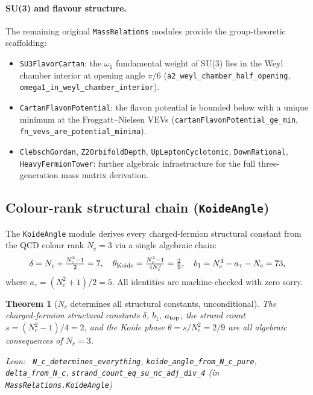 \documentclass[11pt,a4paper]{article}
\newenvironment{leanref}%
  {\par\smallskip\noindent\begingroup\raggedright\textup{Lean:}~}%
  {\par\endgroup}
\newtheorem{theorem}{Theorem}[section]
\theoremstyle{definition}
\begin{document}
\paragraph{SU(3) and flavour structure.}
The remaining original \texttt{MassRelations} modules provide the group-theoretic
scaffolding:
\begin{itemize}[nosep]
\item \texttt{SU3FlavorCartan}: the $\omega_1$ fundamental weight of
  SU(3) lies in the Weyl chamber interior at opening angle $\pi/6$
  (\lstinline|a2_weyl_chamber_half_opening|,
  \lstinline|omega1_in_weyl_chamber_interior|).
\item \texttt{CartanFlavonPotential}: the flavon potential is bounded
  below with a unique minimum at the Froggatt--Nielsen VEVs
  (\lstinline|cartanFlavonPotential_ge_min|,
  \lstinline|fn_vevs_are_potential_minima|).
\item \texttt{ClebschGordan}, \texttt{Z2OrbifoldDepth},
  \texttt{UpLeptonCyclotomic}, \texttt{DownRational},
  \texttt{HeavyFermionTower}: further algebraic infrastructure
  for the full three-generation mass matrix derivation.
\end{itemize}

\subsection{Colour-rank structural chain (\texttt{KoideAngle})}\label{subsec:koideangle}

The \texttt{KoideAngle} module derives every charged-fermion structural
constant from the QCD colour rank $N_c = 3$ via a single algebraic chain:
\[
  \delta = N_c + \tfrac{N_c^2-1}{2} = 7,\quad
  \theta_{\rm Koide} = \tfrac{N_c^2-1}{4N_c^2} = \tfrac{2}{9},\quad
  b_1 = N_c^4 - a_\tau - N_c = 73,
\]
where $a_\tau = (N_c^2+1)/2 = 5$.  All identities are machine-checked with zero sorry.

\begin{theorem}[$N_c$ determines all structural constants, unconditional]\label{thm:nc-chain}
The charged-fermion structural constants $\delta$, $b_1$, $a_{\rm top}$,
the strand count $s = (N_c^2-1)/4 = 2$, and the Koide phase
$\theta = s/N_c^2 = 2/9$ are all algebraic consequences of $N_c = 3$.

\begin{leanref} \lstinline|N_c_determines_everything|,
\lstinline|koide_angle_from_N_c_pure|,
\lstinline|delta_from_N_c|, \lstinline|strand_count_eq_su_nc_adj_div_4|
\textup{(in \texttt{MassRelations.KoideAngle})}
\end{leanref}
\end{theorem}
\end{document}
